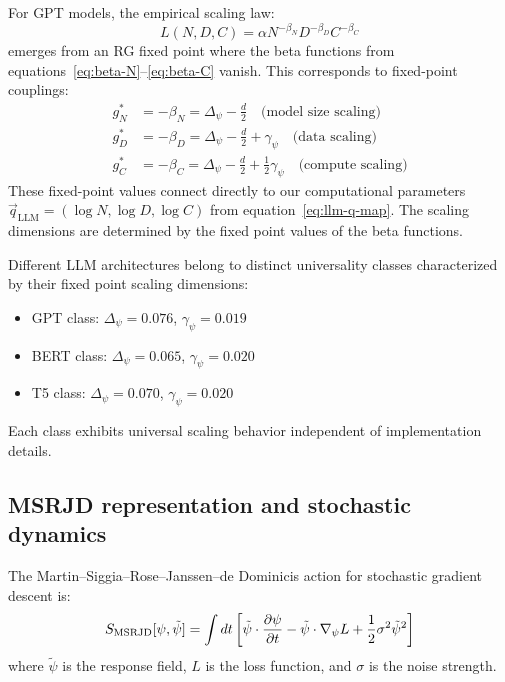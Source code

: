 \begin{example}
\label{ex:gpt_rg_fixed_point}
For GPT models, the empirical scaling law:
\begin{equation}
  L(N,D,C) = \alpha N^{-\beta_N} D^{-\beta_D} C^{-\beta_C}
  \label{eq:gpt_scaling}
\end{equation}
emerges from an RG fixed point where the beta functions from equations~\eqref{eq:beta-N}--\eqref{eq:beta-C} vanish. This corresponds to fixed-point couplings:
\begin{align}
  g_N^* &= -\beta_N = \Delta_\psi - \frac{d}{2} \quad \text{(model size scaling)} \label{eq:gpt-gn} \\
  g_D^* &= -\beta_D = \Delta_\psi - \frac{d}{2} + \gamma_\psi \quad \text{(data scaling)} \label{eq:gpt-gd} \\
  g_C^* &= -\beta_C = \Delta_\psi - \frac{d}{2} + \frac{1}{2}\gamma_\psi \quad \text{(compute scaling)} \label{eq:gpt-gc}
\end{align}
These fixed-point values connect directly to our computational parameters $\vec{q}_{\text{LLM}} = (\log N, \log D, \log C)$ from equation~\eqref{eq:llm-q-map}.
The scaling dimensions are determined by the fixed point values of the beta functions.
\end{example}

\begin{theorem}
\label{thm:universality_classes_training}
Different LLM architectures belong to distinct universality classes characterized by their fixed point scaling dimensions:
\begin{itemize}
\item GPT class: $\Delta_\psi = 0.076$, $\gamma_\psi = 0.019$
\item BERT class: $\Delta_\psi = 0.065$, $\gamma_\psi = 0.020$
\item T5 class: $\Delta_\psi = 0.070$, $\gamma_\psi = 0.020$
\end{itemize}
Each class exhibits universal scaling behavior independent of implementation details.
\end{theorem}

\subsection{MSRJD representation and stochastic dynamics}

\begin{definition}
\label{def:msrjd_action}
The Martin--Siggia--Rose--Janssen--de Dominicis action for stochastic gradient descent is:
\begin{equation}
  S_{\rm MSRJD}[\psi,\tilde{\psi}] = \int dt \left[ \tilde{\psi} \cdot \frac{\partial \psi}{\partial t} - \tilde{\psi} \cdot \nabla_\psi L + \frac{1}{2} \sigma^2 \tilde{\psi}^2 \right]
  \label{eq:msrjd_action}
\end{equation}
where $\tilde{\psi}$ is the response field, $L$ is the loss function, and $\sigma$ is the noise strength.
\end{definition}

